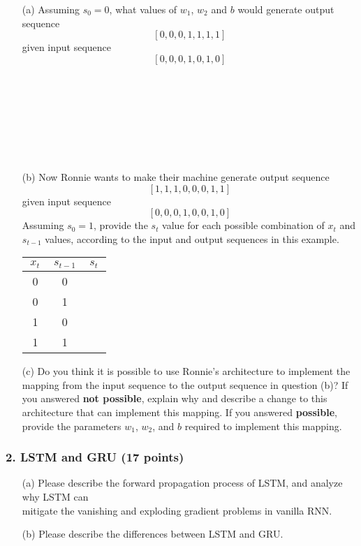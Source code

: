 \documentclass[12pt]{article}%
\begin{document}
\begin{itemize}
	\item[(a)] Assuming $s_0 = 0$, what values of $w_1$, $w_2$ and $b$ would generate output sequence
	$$[0, 0, 0, 1, 1, 1, 1]$$
	given input sequence
	$$[0, 0, 0, 1, 0, 1, 0]$$
	\\\\\\\\\\\\\\



	\item[(b)] Now Ronnie wants to make their machine generate output sequence
	$$[1, 1, 1, 0, 0, 0, 1, 1]$$
	given input sequence
	$$[0, 0, 0, 1, 0, 0, 1, 0]$$
	Assuming $s_0 = 1$, provide the $s_t$ value for each possible combination of $x_t$ and $s_{t-1}$
values, according to the input and output sequences in this example.
\begin{center}
	\begin{tabular}{|c|c|c|}  
		\hline
		$\ x_t\ $& $s_{t-1}$ &$\ s_t\ $\\ \hline
		0&0& \\ \hline
		0&1& \\ \hline
		1&0& \\ \hline
		1&1& \\ \hline
		\end{tabular} 
\end{center}

\newpage
		\item[(c)] Do you think it is possible to use Ronnie’s architecture to implement the mapping from the input sequence to the output sequence in question (b)?
		If you answered \textbf{not possible}, explain why and describe a change to this architecture that
		can implement this mapping. If you answered \textbf{possible}, provide the parameters $w_1$, $w_2$, and
		$b$ required to implement this mapping.
	\end{itemize}


\newpage


\subsubsection*{2. LSTM and GRU (17 points)}

\begin{itemize}
	\setlength{\itemsep}{-1pt}
	\setlength{\parsep}{0pt}
\setlength{\parskip}{0pt}
	\item[(a)] Please describe the forward propagation process of LSTM, and analyze why LSTM can \\mitigate the vanishing and exploding gradient problems in vanilla RNN.\\
	\item[(b)] Please describe the differences between LSTM and GRU.\\ 
\end{itemize}
\newpage
\end{document}
